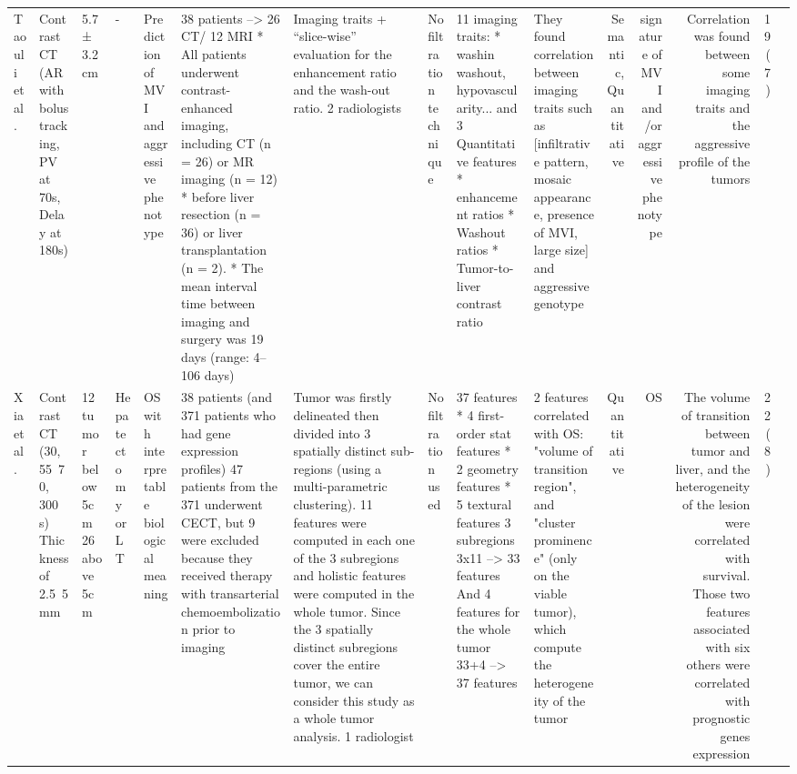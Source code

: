 \begin{landscape}
\begin{table}[!htp]
\begin{tabular}{lp{1.5cm}p{1.5cm}p{2cm}p{2.5cm}p{3cm}p{3cm}p{2cm}p{3cm}p{2cm}rrrrr}
Taouli et al. &Contrast CT (AR with bolus tracking, PV at 70s, Delay at 180s) &5.7 ± 3.2 cm &- &Prediction of MVI and aggressive phenotype &38 patients --> 26 CT/ 12 MRI * All patients underwent contrast-enhanced imaging, including CT (n = 26) or MR imaging (n = 12) * before liver resection (n = 36) or liver transplantation (n = 2). * The mean interval time between imaging and surgery was 19 days (range: 4–106 days) &Imaging traits + “slice-wise” evaluation for the enhancement ratio and the wash-out ratio. 2 radiologists &No filtration technique &11 imaging traits: * washin washout, hypovascularity... and 3 Quantitative features * enhancement ratios * Washout ratios * Tumor-to-liver contrast ratio &They found correlation between imaging traits such as [infiltrative pattern, mosaic appearance, presence of MVI, large size] and aggressive genotype &Semantic, Quantitative &signature of MVI and/or aggressive phenotype &Correlation was found between some imaging traits and the aggressive profile of the tumors &19 (7) \\
Xia et al. &Contrast CT (30, 55~70, 300 s) Thickness of 2.5~5mm &12 tumor below 5cm 26 above 5cm &Hepatectomy or LT &OS with interpretable biological meaning &38 patients (and 371 patients who had gene expression profiles) 47 patients from the 371 underwent CECT, but 9 were excluded because they received therapy with transarterial chemoembolization prior to imaging &Tumor was firstly delineated then divided into 3 spatially distinct sub-regions (using a multi-parametric clustering). 11 features were computed in each one of the 3 subregions and holistic features were computed in the whole tumor. Since the 3 spatially distinct subregions cover the entire tumor, we can consider this study as a whole tumor analysis. 1 radiologist &No filtration used &37 features * 4 first-order stat features * 2 geometry features * 5 textural features 3 subregions 3x11 --> 33 features And 4 features for the whole tumor 33+4 --> 37 features &2 features correlated with OS: "volume of transition region", and "cluster prominence" (only on the viable tumor), which compute the heterogeneity of the tumor &Quantitative &OS &The volume of transition between tumor and liver, and the heterogeneity of the lesion were correlated with survival. Those two features associated with six others were correlated with prognostic genes expression &22 (8) \\
\bottomrule
\end{tabular}
\end{table}
\end{landscape}

\renewcommand{\arraystretch}{5}
\normalsize